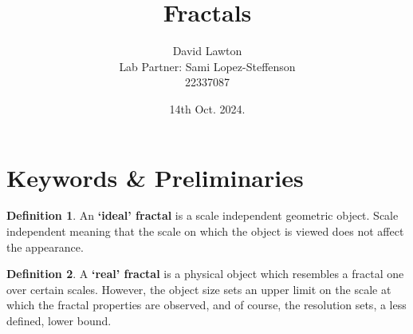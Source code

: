 \documentclass{article}
\title{Fractals}
\author{David Lawton\\
        Lab Partner: Sami Lopez-Steffenson\\
        22337087}
\date{14th Oct. 2024.}
\theoremstyle{definition}
\newtheorem{definition}{Definition}[section]
\theoremstyle{remark}
\begin{document}
\maketitle

\tableofcontents
{}
\begin{abstract}
        
\end{abstract}

\section{Keywords \& Preliminaries}
\begin{definition}
        An \textbf{`ideal' fractal} is a scale independent geometric object. Scale independent meaning that the scale on which the object is viewed does not affect the appearance.\cite{LabHandbook}
\end{definition}
\begin{definition}
        A \textbf{`real' fractal} is a physical object which resembles a fractal one over certain scales. However, the object size sets an upper limit on the scale at which the fractal properties are observed, and of course, the resolution sets, a less defined, lower bound.\cite{LabHandbook}
\end{definition}
\end{document}
